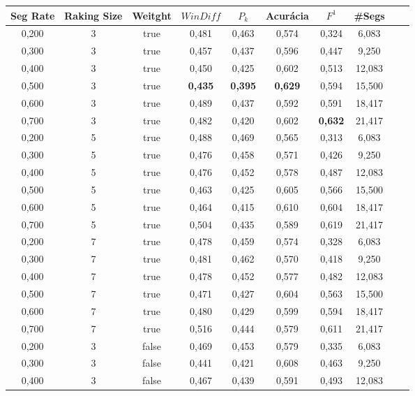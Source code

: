 \documentclass{article}
\begin{document}
\begin{longtable}[c]{|c|c|c|c|c|c|c|c|c|c|} 
\hline 
 Seg Rate & Raking Size & Weitght & $WinDiff$ & $P_k$ & Acurácia & $F^1$ & \#Segs\\ \hline 
 0,200 & 3 & true & 0,481 & 0,463 & 0,574 & 0,324 & 6,083  \\ \hline 
 0,300 & 3 & true & 0,457 & 0,437 & 0,596 & 0,447 & 9,250  \\ \hline 
 0,400 & 3 & true & 0,450 & 0,425 & 0,602 & 0,513 & 12,083  \\ \hline 
 0,500 & 3 & true & \cellcolor{gray!20} \textbf{0,435} & \cellcolor{gray!20} \textbf{0,395} & \cellcolor{gray!20} \textbf{0,629} & 0,594 & 15,500  \\ \hline 
 0,600 & 3 & true & 0,489 & 0,437 & 0,592 & 0,591 & 18,417  \\ \hline 
 0,700 & 3 & true & 0,482 & 0,420 & 0,602 & \cellcolor{gray!20} \textbf{0,632} & 21,417  \\ \hline 
 0,200 & 5 & true & 0,488 & 0,469 & 0,565 & 0,313 & 6,083  \\ \hline 
 0,300 & 5 & true & 0,476 & 0,458 & 0,571 & 0,426 & 9,250  \\ \hline 
 0,400 & 5 & true & 0,476 & 0,452 & 0,578 & 0,487 & 12,083  \\ \hline 
 0,500 & 5 & true & 0,463 & 0,425 & 0,605 & 0,566 & 15,500  \\ \hline 
 0,600 & 5 & true & 0,464 & 0,415 & 0,610 & 0,604 & 18,417  \\ \hline 
 0,700 & 5 & true & 0,504 & 0,435 & 0,589 & 0,619 & 21,417  \\ \hline 
 0,200 & 7 & true & 0,478 & 0,459 & 0,574 & 0,328 & 6,083  \\ \hline 
 0,300 & 7 & true & 0,481 & 0,462 & 0,570 & 0,418 & 9,250  \\ \hline 
 0,400 & 7 & true & 0,478 & 0,452 & 0,577 & 0,482 & 12,083  \\ \hline 
 0,500 & 7 & true & 0,471 & 0,427 & 0,604 & 0,563 & 15,500  \\ \hline 
 0,600 & 7 & true & 0,480 & 0,429 & 0,599 & 0,594 & 18,417  \\ \hline 
 0,700 & 7 & true & 0,516 & 0,444 & 0,579 & 0,611 & 21,417  \\ \hline 
 0,200 & 3 & false & 0,469 & 0,453 & 0,579 & 0,335 & 6,083  \\ \hline 
 0,300 & 3 & false & 0,441 & 0,421 & 0,608 & 0,463 & 9,250  \\ \hline 
 0,400 & 3 & false & 0,467 & 0,439 & 0,591 & 0,493 & 12,083  \\ \hline 

\end{longtable}
\end{document}
